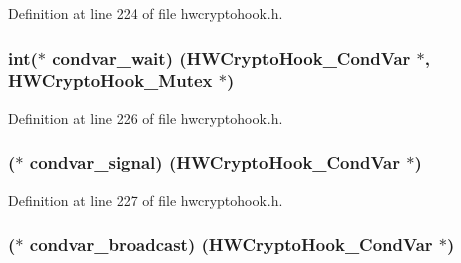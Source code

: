 Definition at line 224 of file hwcryptohook.\+h.

\subsubsection[{\texorpdfstring{condvar\+\_\+wait}{condvar_wait}}]{\setlength{\rightskip}{0pt plus 5cm}int($\ast$ condvar\+\_\+wait) ({\bf H\+W\+Crypto\+Hook\+\_\+\+Cond\+Var} $\ast$, {\bf H\+W\+Crypto\+Hook\+\_\+\+Mutex} $\ast$)}\hypertarget{struct_h_w_crypto_hook___init_info_a764dc65c7f74b7dcdcdd38ea075c0692}{}\label{struct_h_w_crypto_hook___init_info_a764dc65c7f74b7dcdcdd38ea075c0692}


Definition at line 226 of file hwcryptohook.\+h.

\subsubsection[{\texorpdfstring{condvar\+\_\+signal}{condvar_signal}}]{($\ast$ condvar\+\_\+signal) ({\bf H\+W\+Crypto\+Hook\+\_\+\+Cond\+Var} $\ast$)}\hypertarget{struct_h_w_crypto_hook___init_info_afb09339e4ec421419274f8177cc8d6fe}{}\label{struct_h_w_crypto_hook___init_info_afb09339e4ec421419274f8177cc8d6fe}


Definition at line 227 of file hwcryptohook.\+h.

\subsubsection[{\texorpdfstring{condvar\+\_\+broadcast}{condvar_broadcast}}]{($\ast$ condvar\+\_\+broadcast) ({\bf H\+W\+Crypto\+Hook\+\_\+\+Cond\+Var} $\ast$)}\hypertarget{struct_h_w_crypto_hook___init_info_a946011d3de85224b63a72b3fa66e2dfc}{}\label{struct_h_w_crypto_hook___init_info_a946011d3de85224b63a72b3fa66e2dfc}


